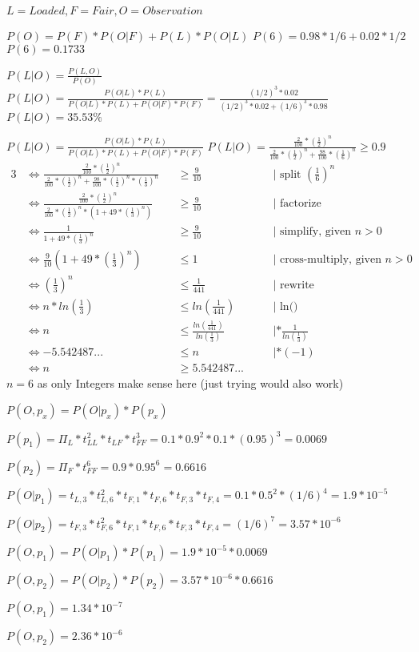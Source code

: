 $L = Loaded, F = Fair, O = Observation$

$P(O) = P(F)* P(O|F)+ P(L) * P(O|L)$
$P(6) = 0.98*1/6 + 0.02*1/2$
$P(6) = 0.1733$


$P(L|O) = \frac{P(L,O)}{P(O)}$
$P(L|O) = \frac{P(O|L)*P(L)}{P(O|L)*P(L) + P(O|F)*P(F)} = \frac{(1/2)^3*0.02}{(1/2)^3*0.02 + (1/6)^3*0.98}$
$P(L|O) = 35.53\%$


$P(L|O) = \frac{P(O|L)*P(L)}{P(O|L)*P(L) + P(O|F)*P(F)}$
$P(L|O) = \frac{\frac{2}{100}*(\frac{1}{2})^n}{\frac{2}{100}*(\frac{1}{2})^n + \frac{98}{100}*(\frac{1}{6})^n} \geq 0.9$
\begin{alignat}{3}
&\iff \frac{\frac{2}{100}*(\frac{1}{2})^n}{\frac{2}{100}*(\frac{1}{2})^n + \frac{98}{100}*(\frac{1}{2})^n * (\frac{1}{3})^n} &&\geq \frac{9}{10}  &&\quad| \text{ split } (\frac{1}{6})^n\\
&\iff \frac{\frac{2}{100}*(\frac{1}{2})^n}{\frac{2}{100}*(\frac{1}{2})^n * (1 + 49 * (\frac{1}{3})^n)} &&\geq \frac{9}{10}  &&\quad| \text{ factorize}\\
&\iff \frac{1}{1 + 49 * (\frac{1}{3})^n} &&\geq \frac{9}{10} &&\quad| \text{ simplify, given } n > 0\\
&\iff \frac{9}{10} (1 + 49 * (\frac{1}{3})^n) &&\leq 1  &&\quad| \text{ cross-multiply, given } n > 0\\
&\iff (\frac{1}{3})^n &&\leq \frac{1}{441} &&\quad| \text{ rewrite }\\
&\iff n * ln(\frac{1}{3}) &&\leq ln(\frac{1}{441}) &&\quad| \text{ ln() }\\
&\iff n &&\leq \frac{ln(\frac{1}{441})}{ln(\frac{1}{3})} &&\quad| *\frac{1}{ln(\frac{1}{3})} \\
&\iff -5.542487... &&\leq n &&\quad| * (-1)\\
&\iff n &&\geq 5.542487...
\end{alignat}
$n = 6$ as only Integers make sense here (just trying would also work)


$P(O, p_x) = P(O|p_x) * P(p_x)$


$P(p_1)=\Pi_L * t_{LL}^2 * t_{LF} * t_{FF}^3 = 0.1 * 0.9^2 * 0.1 * (0.95)^3 = 0.0069$

$P(p_2)=\Pi_F * t_{FF}^6  = 0.9 * 0.95^6 = 0.6616$

$P(O|p_1)=t_{L,3}*t_{L,6}^2*t_{F,1}*t_{F,6}*t_{F,3}*t_{F,4} = 0.1 * 0.5^2 * (1/6)^4 = 1.9 * 10^{-5}$

$P(O|p_2)=t_{F,3}*t_{F,6}^2*t_{F,1}*t_{F,6}*t_{F,3}*t_{F,4} = (1/6)^7 = 3.57 * 10^{-6}$

$P(O,p_1)=P(O|p_1)*P(p_1)= 1.9 * 10^{-5} * 0.0069$

$P(O,p_2)=P(O|p_2)*P(p_2)= 3.57 * 10^{-6} * 0.6616$


$P(O,p_1)= 1.34 * 10^{-7}$

$P(O,p_2)= 2.36 * 10^{-6}$
